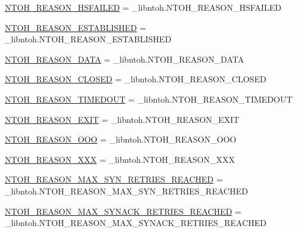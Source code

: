 \begin{DoxyCompactItemize}
\item 
\hyperlink{namespacelibntoh_adc201d9980eaa572c6c1b70362933174}{N\-T\-O\-H\-\_\-\-R\-E\-A\-S\-O\-N\-\_\-\-H\-S\-F\-A\-I\-L\-E\-D} = \-\_\-libntoh.\-N\-T\-O\-H\-\_\-\-R\-E\-A\-S\-O\-N\-\_\-\-H\-S\-F\-A\-I\-L\-E\-D
\item 
\hyperlink{namespacelibntoh_a97b282b81daa1511772c502e1107df9e}{N\-T\-O\-H\-\_\-\-R\-E\-A\-S\-O\-N\-\_\-\-E\-S\-T\-A\-B\-L\-I\-S\-H\-E\-D} = \-\_\-libntoh.\-N\-T\-O\-H\-\_\-\-R\-E\-A\-S\-O\-N\-\_\-\-E\-S\-T\-A\-B\-L\-I\-S\-H\-E\-D
\item 
\hyperlink{namespacelibntoh_aa41d897ecfb93916efdf59c03f7420b2}{N\-T\-O\-H\-\_\-\-R\-E\-A\-S\-O\-N\-\_\-\-D\-A\-T\-A} = \-\_\-libntoh.\-N\-T\-O\-H\-\_\-\-R\-E\-A\-S\-O\-N\-\_\-\-D\-A\-T\-A
\item 
\hyperlink{namespacelibntoh_abc4fd62fbdc92f3c0ee25e8465383d76}{N\-T\-O\-H\-\_\-\-R\-E\-A\-S\-O\-N\-\_\-\-C\-L\-O\-S\-E\-D} = \-\_\-libntoh.\-N\-T\-O\-H\-\_\-\-R\-E\-A\-S\-O\-N\-\_\-\-C\-L\-O\-S\-E\-D
\item 
\hyperlink{namespacelibntoh_a635133a716f69e0e2dd6800c5bb3f5e1}{N\-T\-O\-H\-\_\-\-R\-E\-A\-S\-O\-N\-\_\-\-T\-I\-M\-E\-D\-O\-U\-T} = \-\_\-libntoh.\-N\-T\-O\-H\-\_\-\-R\-E\-A\-S\-O\-N\-\_\-\-T\-I\-M\-E\-D\-O\-U\-T
\item 
\hyperlink{namespacelibntoh_a891f40cab16447933d5755ad8c84ffb7}{N\-T\-O\-H\-\_\-\-R\-E\-A\-S\-O\-N\-\_\-\-E\-X\-I\-T} = \-\_\-libntoh.\-N\-T\-O\-H\-\_\-\-R\-E\-A\-S\-O\-N\-\_\-\-E\-X\-I\-T
\item 
\hyperlink{namespacelibntoh_a501df94380086c174cd681bbf634af9b}{N\-T\-O\-H\-\_\-\-R\-E\-A\-S\-O\-N\-\_\-\-O\-O\-O} = \-\_\-libntoh.\-N\-T\-O\-H\-\_\-\-R\-E\-A\-S\-O\-N\-\_\-\-O\-O\-O
\item 
\hyperlink{namespacelibntoh_a639c460157795d624b701707815f298e}{N\-T\-O\-H\-\_\-\-R\-E\-A\-S\-O\-N\-\_\-\-X\-X\-X} = \-\_\-libntoh.\-N\-T\-O\-H\-\_\-\-R\-E\-A\-S\-O\-N\-\_\-\-X\-X\-X
\item 
\hyperlink{namespacelibntoh_a14a9434db1cf0377fe23ea1352892793}{N\-T\-O\-H\-\_\-\-R\-E\-A\-S\-O\-N\-\_\-\-M\-A\-X\-\_\-\-S\-Y\-N\-\_\-\-R\-E\-T\-R\-I\-E\-S\-\_\-\-R\-E\-A\-C\-H\-E\-D} = \-\_\-libntoh.\-N\-T\-O\-H\-\_\-\-R\-E\-A\-S\-O\-N\-\_\-\-M\-A\-X\-\_\-\-S\-Y\-N\-\_\-\-R\-E\-T\-R\-I\-E\-S\-\_\-\-R\-E\-A\-C\-H\-E\-D
\item 
\hyperlink{namespacelibntoh_a43c471874b63185d6f40ecee3b9fed49}{N\-T\-O\-H\-\_\-\-R\-E\-A\-S\-O\-N\-\_\-\-M\-A\-X\-\_\-\-S\-Y\-N\-A\-C\-K\-\_\-\-R\-E\-T\-R\-I\-E\-S\-\_\-\-R\-E\-A\-C\-H\-E\-D} = \-\_\-libntoh.\-N\-T\-O\-H\-\_\-\-R\-E\-A\-S\-O\-N\-\_\-\-M\-A\-X\-\_\-\-S\-Y\-N\-A\-C\-K\-\_\-\-R\-E\-T\-R\-I\-E\-S\-\_\-\-R\-E\-A\-C\-H\-E\-D

\end{DoxyCompactItemize}
